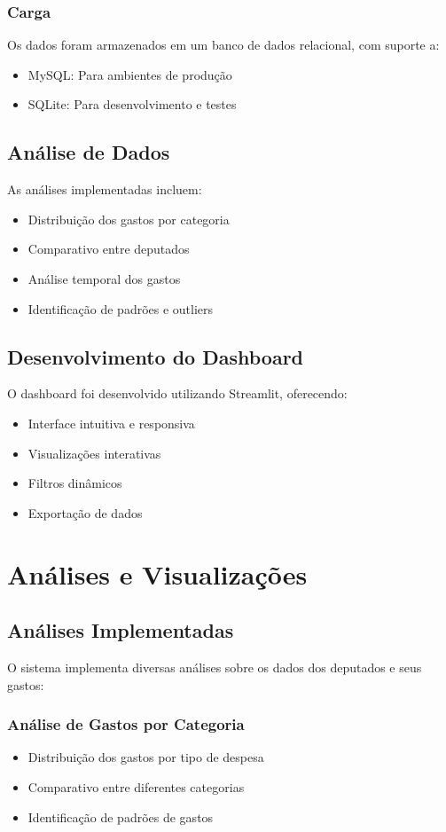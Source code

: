 \documentclass[12pt,a4paper]{article}
\begin{document}
\subsubsection{Carga}
Os dados foram armazenados em um banco de dados relacional, com suporte a:
\begin{itemize}
    \item MySQL: Para ambientes de produção
    \item SQLite: Para desenvolvimento e testes
\end{itemize}

\subsection{Análise de Dados}
As análises implementadas incluem:
\begin{itemize}
    \item Distribuição dos gastos por categoria
    \item Comparativo entre deputados
    \item Análise temporal dos gastos
    \item Identificação de padrões e outliers
\end{itemize}

\subsection{Desenvolvimento do Dashboard}
O dashboard foi desenvolvido utilizando Streamlit, oferecendo:
\begin{itemize}
    \item Interface intuitiva e responsiva
    \item Visualizações interativas
    \item Filtros dinâmicos
    \item Exportação de dados
\end{itemize}

\section{Análises e Visualizações}
\subsection{Análises Implementadas}
O sistema implementa diversas análises sobre os dados dos deputados e seus gastos:

\subsubsection{Análise de Gastos por Categoria}
\begin{itemize}
    \item Distribuição dos gastos por tipo de despesa
    \item Comparativo entre diferentes categorias
    \item Identificação de padrões de gastos
\end{itemize}
\end{document}
